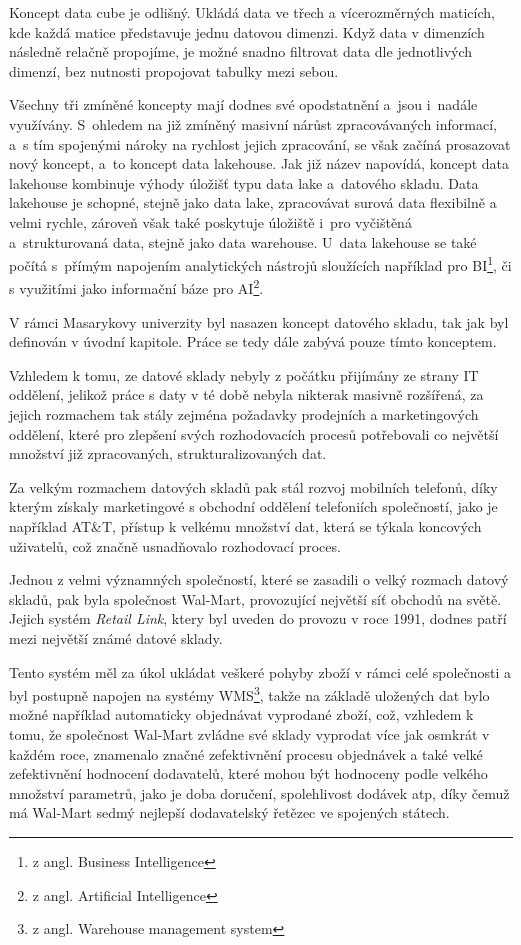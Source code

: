 \documentclass[
  digital,     %
  twoside,     %
  lof,         %
  lot,         %
]{fithesis4}
\begin{document}
Koncept data cube je odlišný. Ukládá data ve třech a vícerozměrných maticích, kde každá matice představuje jednu datovou dimenzi. Když data v dimenzích následně relačně propojíme, je možné snadno filtrovat data dle jednotlivých dimenzí, bez nutnosti propojovat tabulky mezi sebou.\parencite{Foote19042018}

Všechny tři zmíněné koncepty mají dodnes své opodstatnění a jsou i nadále využívány. S ohledem na již zmíněný masivní nárůst zpracovávaných informací, a s tím spojenými nároky na rychlost jejich zpracování, se však začíná prosazovat nový koncept, a to koncept data lakehouse. Jak již název napovídá, koncept data lakehouse kombinuje výhody úložišť typu data lake a datového skladu. Data lakehouse je schopné, stejně jako data lake, zpracovávat surová data flexibilně a velmi rychle, zároveň však také poskytuje úložiště i pro vyčištěná a strukturovaná data, stejně jako data warehouse. U data lakehouse se také počítá s přímým napojením analytických nástrojů sloužících například pro BI\footnote{z angl. Business Intelligence}, či s využitími jako informační báze pro AI\footnote{z angl. Artificial Intelligence}.

V rámci Masarykovy univerzity byl nasazen koncept datového skladu, tak jak byl definován v úvodní kapitole. Práce se tedy dále zabývá pouze tímto konceptem.

Vzhledem k tomu, ze datové sklady nebyly z počátku přijímány ze strany IT oddělení, jelikož práce s daty v té době nebyla nikterak masivně rozšířená, za jejich rozmachem tak stály zejména požadavky prodejních a marketingových oddělení, které pro zlepšení svých rozhodovacích procesů potřebovali co největší množství již zpracovaných, strukturalizovaných dat. \parencite{Inmon2021}

Za velkým rozmachem datových skladů pak stál rozvoj mobilních telefonů, díky kterým získaly marketingové s obchodní oddělení telefoniích společností, jako je například AT\&T, přístup k velkému množství dat, která se týkala koncových uživatelů, což značně usnadňovalo rozhodovací proces.\parencite{Inmon2021}

Jednou z velmi významných společností, které se zasadili o velký rozmach datový skladů, pak byla společnost Wal-Mart, provozující největší síť obchodů na světě. Jejich systém \emph{Retail Link}, ktery byl uveden do provozu v roce 1991, dodnes patří mezi největší známé datové sklady.\parencite{Gallaugher2018}

Tento systém měl za úkol ukládat veškeré pohyby zboží v rámci celé společnosti a byl postupně napojen na systémy WMS\footnote{z angl. Warehouse management system}, takže na základě uložených dat bylo možné například automaticky objednávat vyprodané zboží, což, vzhledem k tomu, že společnost Wal-Mart zvládne své sklady vyprodat více jak osmkrát v každém roce, znamenalo značné zefektivnění procesu objednávek a také velké zefektivnění hodnocení dodavatelů, které mohou být hodnoceny podle velkého množství parametrů, jako je doba doručení, spolehlivost dodávek atp, díky čemuž má Wal-Mart sedmý nejlepší dodavatelský řetězec ve spojených státech.\parencite{Gallaugher2018}  
\end{document}
